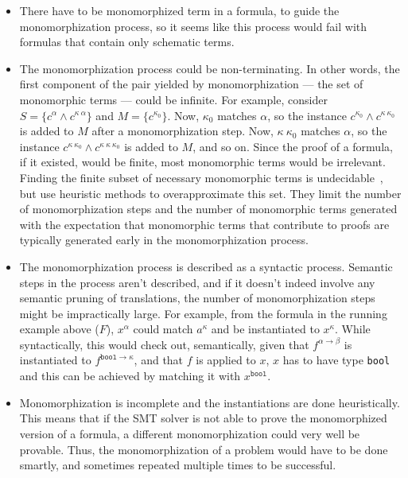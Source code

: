 \documentclass{article}
\begin{document}
		\begin{itemize}
		\item There have to be monomorphized 
			term in a formula, to guide the 
			monomorphization process, so it 
			seems like this process would 
			fail with formulas that contain 
			only schematic terms. 
		\item The monomorphization process 
			could be non-terminating. In 
			other words, the first component
			of the pair yielded by 
			monomorphization --- the 
			set of monomorphic terms ---
			could be infinite. For example,
			consider $S = \{c^{\alpha}
			\land c^{\kappa\ \alpha}\}$
			and $M = \{c^{\kappa_0}\}$.
			Now, $\kappa_0$ matches 
			$\alpha$, so the instance
			$c^{\kappa_0} \land 
			c^{\kappa\ \kappa_0}$ is added 
			to $M$ after a monomorphization 
			step. Now, $\kappa\ \kappa_0$
			matches $\alpha$, so the 
			instance $c^{\kappa\ \kappa_0} 
			\land c^{\kappa\ \kappa\ 
			\kappa_0}$ is added to $M$, 
			and so on. Since the proof of a 
			formula, if it existed, would 
			be finite, most monomorphic 
			terms would be irrelevant. 
			Finding the finite subset of 
			necessary monomorphic terms is 
			undecidable~\cite{10.1007/978-3-642-24364-6_7},
			but \cite{bohme} use heuristic
			methods to overapproximate
			this set. They limit the 
			number of monomorphization 
			steps and the number of 
			monomorphic terms generated
			with the expectation that 
			monomorphic terms that 
			contribute to proofs 
			are typically generated early 
			in the monomorphization process.
		\item The monomorphization process
			is described as a syntactic 
			process. Semantic steps in 
			the process aren't described, 
			and if it doesn't indeed 
			involve	any semantic pruning of 
			translations, the number of 
			monomorphization steps 
			might be impractically large. 
			For example, from the formula 
			in the running example above ($F$), 
			$x^{\alpha}$ could match 
			$a^{\kappa}$ and be instantiated 
			to $x^{\kappa}$. While 
			syntactically, this would 
			check out, semantically, 
			given that $f^{\alpha \to \beta}$
			is instantiated to 
			$f^{\texttt{bool} \to \kappa}$, 
			and that $f$ is applied to $x$, 
			$x$ has to have type 
			\texttt{bool} and this can be 
			achieved by matching it with 
			$x^{\texttt{bool}}$.
		\item Monomorphization is 
			incomplete and the instantiations 
			are done heuristically. This 
			means that if the SMT solver 
			is not able to prove the 
			monomorphized version of a 
			formula, a different 
			monomorphization could 
			very well be provable. Thus, 
			the monomorphization of a 
			problem would have to be 
			done smartly, and sometimes
			repeated multiple times to 
			be successful. 
		\end{itemize}
	
\end{document}

